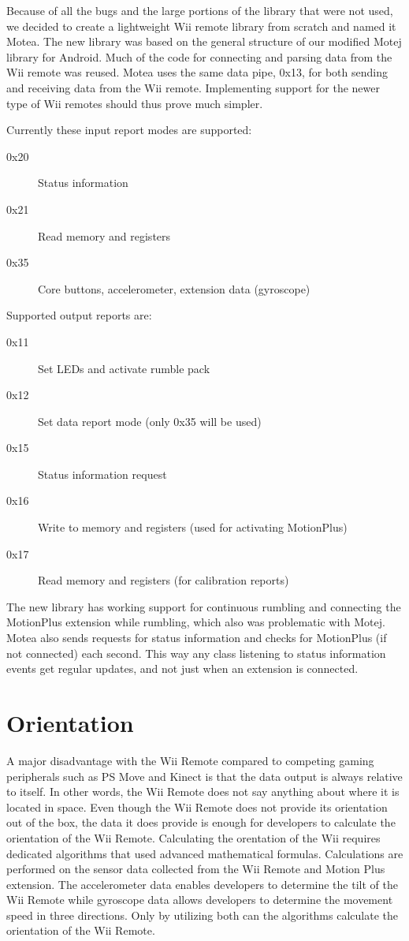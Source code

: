 Because of all the bugs and the large portions of the library that were not used, we decided to create a lightweight Wii remote library from scratch and named it Motea. The new library was based on the general structure of our modified Motej library for Android. Much of the code for connecting and parsing data from the Wii remote was reused. Motea uses the same data pipe, 0x13, for both sending and receiving data from the Wii remote. Implementing support for the newer type of Wii remotes should thus prove much simpler.

Currently these input report modes are supported:
\begin{description}
	\item[0x20] Status information
	\item[0x21] Read memory and registers
	\item[0x35] Core buttons, accelerometer, extension data (gyroscope)
\end{description}

Supported output reports are:
\begin{description}
	\item[0x11] Set LEDs and activate rumble pack
	\item[0x12] Set data report mode (only 0x35 will be used)
	\item[0x15] Status information request
	\item[0x16] Write to memory and registers (used for activating MotionPlus)
	\item[0x17] Read memory and registers (for calibration reports)
\end{description}

The new library has working support for continuous rumbling and connecting the MotionPlus extension while rumbling, which also was problematic with Motej. Motea also sends requests for status information and checks for MotionPlus (if not connected) each second. This way any class listening to status information events get regular updates, and not just when an extension is connected.

\section{Orientation}
A major disadvantage with the Wii Remote compared to competing gaming peripherals such as PS Move and Kinect is that the data output is always relative to itself. In other words, the Wii Remote does not say anything about where it is located in space. Even though the Wii Remote does not provide its orientation out of the box, the data it does provide is enough for developers to calculate the orientation of the Wii Remote. Calculating the orentation of the Wii requires dedicated algorithms that used advanced mathematical formulas. Calculations are performed on the sensor data collected from the Wii Remote and Motion Plus extension. The accelerometer data enables developers to determine the tilt of the Wii Remote while gyroscope data allows developers to determine the movement speed in three directions. Only by utilizing both can the algorithms calculate the orientation of the Wii Remote.

